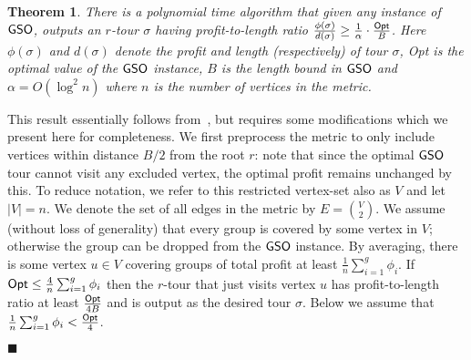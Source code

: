 \documentclass[11pt]{article}
\newtheorem{theorem}[thm]{Theorem}
\def\opt{{\sf Opt}\xspace}
\newcommand{\profit}{\phi}
\def\gso{\ensuremath{{\sf GSO}}\xspace}
\newenvironment{pf}{

\noindent{\bf Proof:}} {\hfill$\blacksquare$


}
\begin{document}
\begin{theorem}  \label{thm:gso-ratio}
There is a polynomial time algorithm that given any instance of \gso, outputs an $r$-tour $\sigma$ having profit-to-length ratio $\frac{\profit(\sigma)}{d(\sigma)} \ge \frac{1}{\alpha}\cdot\frac{\opt}{B}$. Here  $\profit(\sigma)$ and $d(\sigma)$ denote the profit and length (respectively) of tour $\sigma$, \opt is the optimal value of the \gso instance, $B$ is the length bound in \gso and $\alpha=O(\log^2n)$ where $n$ is the number of vertices in the metric.
\end{theorem}
\begin{pf} This result essentially follows from~\cite{ccgg}, but requires some modifications  which we present here for completeness. 
We first preprocess the metric to only include
  vertices within distance $B/2$ from the root $r$: note that since the
  optimal \gso tour cannot visit any excluded vertex, the optimal profit
  remains unchanged by this. To reduce notation, we refer to this restricted vertex-set also as $V$ and let $|V|=n$.
  We denote the set of all edges in the metric by $E={V \choose 2}$.
We assume (without loss of generality) that every group is covered by some vertex in $V$; otherwise the group can be dropped from the \gso instance. By averaging, there  is some vertex $u\in V$ covering groups of total profit at least $\frac1n \sum_{i=1}^g \profit_i$. If $\opt\le \frac4{n} \sum_{i=1}^g \profit_i$ then the $r$-tour that just visits vertex $u$ has profit-to-length ratio at least $\frac{\opt}{4B}$ and is output as the desired tour $\sigma$. Below we assume that $\frac1n \sum_{i=1}^g \profit_i < \frac{\opt}{4}$. 

\def\lpgo{\ensuremath{\mathsf{LP}_\gso}\xspace}


\end{pf}
\end{document}
